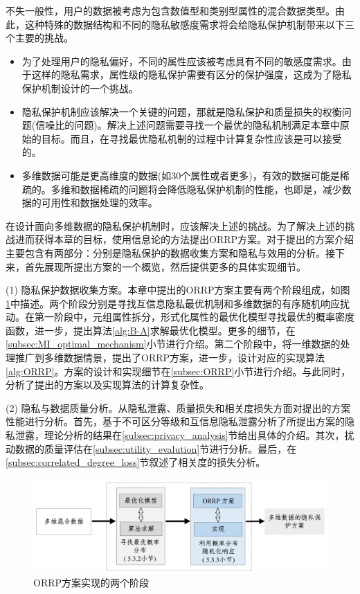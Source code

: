 不失一般性，用户的数据被考虑为包含数值型和类别型属性的混合数据类型。由此，这种特殊的数据结构和不同的隐私敏感度需求将会给隐私保护机制带来以下三个主要的挑战。

\begin{itemize}
\item 为了处理用户的隐私偏好，不同的属性应该被考虑具有不同的敏感度需求。由于这样的隐私需求，属性级的隐私保护需要有区分的保护强度，这成为了隐私保护机制设计的一个挑战。

\item 隐私保护机制应该解决一个关键的问题，那就是隐私保护和质量损失的权衡问题(信噪比的问题\cite{zhang2014privbayes})。解决上述问题需要寻找一个最优的隐私机制满足本章中原始的目标。而且，在寻找最优隐私机制的过程中计算复杂性应该是可以接受的。

\item 多维数据可能是更高维度的数据(如$30$个属性或者更多)，有效的数据可能是稀疏的。多维和数据稀疏的问题将会降低隐私保护机制的性能，也即是，减少数据的可用性和数据处理的效率。
\end{itemize}

在设计面向多维数据的隐私保护机制时，应该解决上述的挑战。为了解决上述的挑战进而获得本章的目标，使用信息论的方法提出ORRP方案。对于提出的方案介绍主要包含有两部分：分别是隐私保护的数据收集方案和隐私与效用的分析。接下来，首先展现所提出方案的一个概览，然后提供更多的具体实现细节。

(1) 隐私保护数据收集方案。本章中提出的ORRP方案主要有两个阶段组成，如图\ref{fig:chapter06_Fig02}中描述。两个阶段分别是寻找互信息隐私最优机制和多维数据的有序随机响应扰动。在第一阶段中，元组属性拆分，形式化属性的最优化模型寻找最优的概率密度函数，进一步，提出算法\ref{alg:B-A}求解最优化模型。更多的细节，在\ref{subsec:MI_optimal_mechanism}小节进行介绍。第二个阶段中，将一维数据的处理推广到多维数据情景，提出了ORRP方案，进一步，设计对应的实现算法\ref{alg:ORRP}。方案的设计和实现细节在\ref{subsec:ORRP}小节进行介绍。与此同时，分析了提出的方案以及实现算法的计算复杂性。

(2) 隐私与数据质量分析。从隐私泄露、质量损失和相关度损失方面对提出的方案性能进行分析。首先，基于不可区分等级和互信息隐私泄露分析了所提出方案的隐私泄露，理论分析的结果在\ref{subsec:privacy_analysis}节给出具体的介绍。其次，扰动数据的质量评估在\ref{subsec:utility_evalution}节进行分析。最后，在\ref{subsec:correlated_degree_loss}节叙述了相关度的损失分析。


\begin{figure}[htbp]
	\centering
	\includegraphics[width = 0.99\linewidth]{./figures/chapter06/chapter06_2.jpg}
	\caption{ORRP方案实现的两个阶段}
	\label{fig:chapter06_Fig02}
\end{figure}

